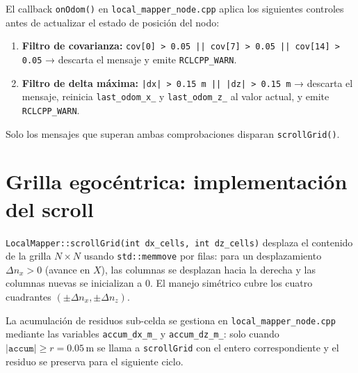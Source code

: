 El callback \texttt{onOdom()} en \texttt{local\_mapper\_node.cpp} aplica los siguientes controles antes de actualizar el estado de posición del nodo:

\begin{enumerate}
  \item \textbf{Filtro de covarianza:} \texttt{cov[0] > 0.05 || cov[7] > 0.05 || cov[14] > 0.05} → descarta el mensaje y emite \texttt{RCLCPP\_WARN}.
  \item \textbf{Filtro de delta máxima:} \texttt{|dx| > 0.15 m || |dz| > 0.15 m} → descarta el mensaje, reinicia \texttt{last\_odom\_x\_} y \texttt{last\_odom\_z\_} al valor actual, y emite \texttt{RCLCPP\_WARN}.
\end{enumerate}

Solo los mensajes que superan ambas comprobaciones disparan \texttt{scrollGrid()}.

\section{Grilla egocéntrica: implementación del scroll}
\label{sec:impl-scroll}

\texttt{LocalMapper::scrollGrid(int dx\_cells, int dz\_cells)} desplaza el contenido de la grilla $N \times N$ usando \texttt{std::memmove} por filas: para un desplazamiento $\Delta n_x > 0$ (avance en $X$), las columnas se desplazan hacia la derecha y las columnas nuevas se inicializan a $0$. El manejo simétrico cubre los cuatro cuadrantes $(\pm\Delta n_x, \pm\Delta n_z)$.

La acumulación de residuos sub-celda se gestiona en \texttt{local\_mapper\_node.cpp} mediante las variables \texttt{accum\_dx\_m\_} y \texttt{accum\_dz\_m\_}: solo cuando $|\texttt{accum}| \geq r = 0.05\,\text{m}$ se llama a \texttt{scrollGrid} con el entero correspondiente y el residuo se preserva para el siguiente ciclo.


